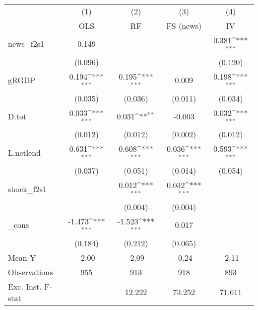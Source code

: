 {
\def\sym#1{\ifmmode^{#1}\else\(^{#1}\)\fi}
\begin{tabular}{l*{4}{c}}
\toprule
            &\multicolumn{1}{c}{(1)}&\multicolumn{1}{c}{(2)}&\multicolumn{1}{c}{(3)}&\multicolumn{1}{c}{(4)}\\
            &\multicolumn{1}{c}{OLS}&\multicolumn{1}{c}{RF}&\multicolumn{1}{c}{FS (news)}&\multicolumn{1}{c}{IV}\\
\midrule
news\_f2s1   &       0.149         &                     &                     &       0.381\sym{***}\\
            &     (0.096)         &                     &                     &     (0.120)         \\
\addlinespace
gRGDP       &       0.194\sym{***}&       0.195\sym{***}&       0.009         &       0.198\sym{***}\\
            &     (0.035)         &     (0.036)         &     (0.011)         &     (0.034)         \\
\addlinespace
D.tot       &       0.033\sym{***}&       0.031\sym{**} &      -0.003         &       0.032\sym{***}\\
            &     (0.012)         &     (0.012)         &     (0.002)         &     (0.012)         \\
\addlinespace
L.netlend   &       0.631\sym{***}&       0.608\sym{***}&       0.036\sym{***}&       0.593\sym{***}\\
            &     (0.037)         &     (0.051)         &     (0.014)         &     (0.054)         \\
\addlinespace
shock\_f2s1  &                     &       0.012\sym{***}&       0.032\sym{***}&                     \\
            &                     &     (0.004)         &     (0.004)         &                     \\
\addlinespace
\_cons      &      -1.473\sym{***}&      -1.523\sym{***}&       0.017         &                     \\
            &     (0.184)         &     (0.212)         &     (0.065)         &                     \\
\midrule
Mean Y      &       -2.00         &       -2.09         &       -0.24         &       -2.11         \\
Observations&         955         &         913         &         918         &         893         \\
Exc. Inst. F-stat&                     &      12.222         &      73.252         &      71.611         \\
\bottomrule
\end{tabular}
}
